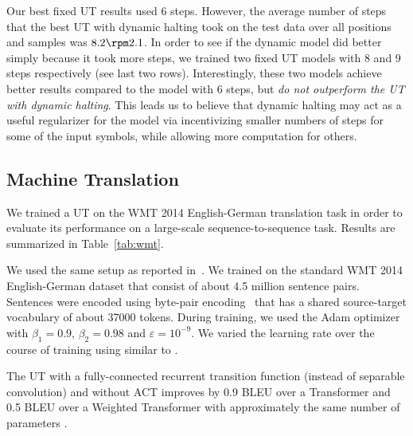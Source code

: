Our best fixed UT results used 6 steps. However, the average number of steps that the best UT with dynamic halting took on the test data over all positions and samples was $8.2 \rpm 2.1$. In order to see if the dynamic model did better simply because it took more steps, we trained two fixed UT models with 8 and 9 steps respectively (see last two rows). Interestingly, these two models achieve better results compared to the model with 6 steps, but \emph{do not outperform the UT with dynamic halting}. This leads us to believe that dynamic halting may act as a useful regularizer for the model via incentivizing smaller numbers of steps for some of the input symbols, while allowing more computation for others.

\subsection{Machine Translation}
We trained a UT on the WMT 2014 English-German translation task in order to evaluate its performance on a large-scale sequence-to-sequence task. Results are summarized in Table~\ref{tab:wmt}. 

We used the same setup as reported in~\citep{transformer}. We trained on the standard WMT 2014 English-German dataset that consist of about 4.5 million sentence pairs. Sentences were encoded using byte-pair encoding~\citep{britz2017massive} that has a shared source-target vocabulary of about 37000 tokens.
During training, we used the Adam optimizer\citep{adam} with $\beta_1 = 0.9$, $\beta_2 = 0.98$ and $\varepsilon = 10^{-9}$. We varied the learning
rate over the course of training using similar to \citep{transformer}. 

The UT with a fully-connected recurrent transition function (instead of separable convolution) and without ACT improves by 0.9 BLEU over a Transformer and 0.5 BLEU over a Weighted Transformer with approximately the same number of parameters \citep{ahmed2017weighted}.



